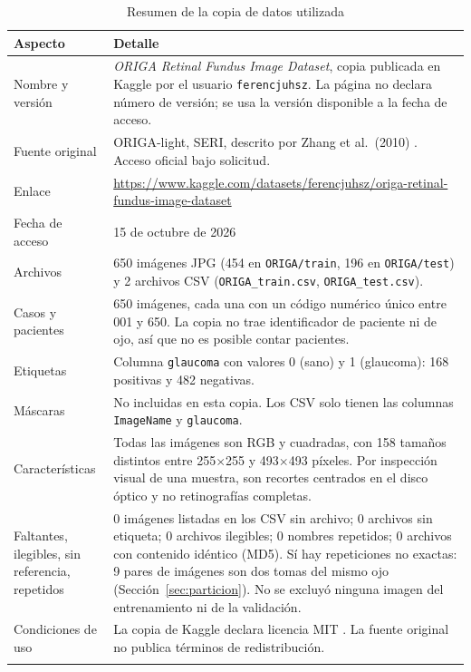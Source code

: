 \documentclass[pdflatex,sn-mathphys-num]{sn-jnl}%
\theoremstyle{thmstyleone}%
\theoremstyle{thmstyletwo}%
\theoremstyle{thmstylethree}%
\begin{document}
\begin{table}[htbp]
\caption{Resumen de la copia de datos utilizada}\label{tab:datos}
\begin{tabularx}{\textwidth}{@{}L{3.6cm}X@{}}
\toprule
Aspecto & Detalle \\
\midrule
Nombre y versión & \textit{ORIGA Retinal Fundus Image Dataset}, copia publicada en Kaggle por el usuario \texttt{ferencjuhsz}. La página no declara número de versión; se usa la versión disponible a la fecha de acceso. \\
Fuente original & ORIGA-light, SERI, descrito por Zhang et al.\ (2010) \cite{zhang2010origa}. Acceso oficial bajo solicitud. \\
Enlace & \url{https://www.kaggle.com/datasets/ferencjuhsz/origa-retinal-fundus-image-dataset} \cite{kaggleoriga} \\
Fecha de acceso & 15 de octubre de 2026 \\
Archivos & 650 imágenes JPG (454 en \texttt{ORIGA/train}, 196 en \texttt{ORIGA/test}) y 2 archivos CSV (\texttt{ORIGA\_train.csv}, \texttt{ORIGA\_test.csv}). \\
Casos y pacientes & 650 imágenes, cada una con un código numérico único entre 001 y 650. La copia no trae identificador de paciente ni de ojo, así que no es posible contar pacientes. \\
Etiquetas & Columna \texttt{glaucoma} con valores 0 (sano) y 1 (glaucoma): 168 positivas y 482 negativas. \\
Máscaras & No incluidas en esta copia. Los CSV solo tienen las columnas \texttt{ImageName} y \texttt{glaucoma}. \\
Características & Todas las imágenes son RGB y cuadradas, con 158 tamaños distintos entre 255$\times$255 y 493$\times$493 píxeles. Por inspección visual de una muestra, son recortes centrados en el disco óptico y no retinografías completas. \\
Faltantes, ilegibles, sin referencia, repetidos & 0 imágenes listadas en los CSV sin archivo; 0 archivos sin etiqueta; 0 archivos ilegibles; 0 nombres repetidos; 0 archivos con contenido idéntico (MD5). Sí hay repeticiones no exactas: 9 pares de imágenes son dos tomas del mismo ojo (Sección~\ref{sec:particion}). No se excluyó ninguna imagen del entrenamiento ni de la validación. \\
Condiciones de uso & La copia de Kaggle declara licencia MIT \cite{mitlicense}. La fuente original no publica términos de redistribución. \\
\botrule
\end{tabularx}
\end{table}
\end{document}
